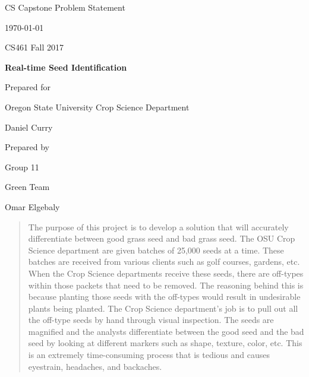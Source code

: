 \documentclass[onecolumn, draftclsnofoot,10pt, compsoc]{IEEEtran}
\def \CapstoneTeamName{			Green Team}
\def \CapstoneTeamNumber{		11}
\def \GroupMemberOne{			Omar Elgebaly}
\def \GroupMemberTwo{			Danny Yang}
\def \GroupMemberThree{			Vinayaka Thompson}
\def \CapstoneProjectName{		Real-time Seed Identification}
\def \CapstoneSponsorCompany{	Oregon State University Crop Science Department}
\def \CapstoneSponsorPerson{	Daniel Curry}
\def \DocType{		Problem Statement
				}
\newcommand{\NameSigPair}[1]{\par
\makebox[2.75in][r]{#1} \hfil 	\makebox[3.25in]{\makebox[2.25in]{\hrulefill} \hfill		\makebox[.75in]{\hrulefill}}
\par\vspace{-12pt} \textit{\tiny\noindent
\makebox[2.75in]{} \hfil		\makebox[3.25in]{\makebox[2.25in][r]{Signature} \hfill	\makebox[.75in][r]{Date}}}}
\renewcommand{\NameSigPair}[1]{#1}
\begin{document}
\begin{titlepage}
    \begin{singlespace}
        \hfill 
        \par\vspace{.2in}
        \centering
        \scshape{
            \huge CS Capstone \DocType \par
            {\large\today}\par
			{\large CS461 Fall 2017}\par
            \vspace{.5in}
            \textbf{\Huge\CapstoneProjectName}\par
            \vfill
            {\large Prepared for}\par
            \Huge \CapstoneSponsorCompany\par
            \vspace{5pt}
            {\Large\NameSigPair{\CapstoneSponsorPerson}\par}
            {\large Prepared by }\par
            Group\CapstoneTeamNumber\par
            \CapstoneTeamName\par 
            \vspace{5pt}
            {\Large
                \NameSigPair{\GroupMemberOne}\par
            }
            \vspace{20pt}
        }
        \begin{abstract}
        	The purpose of this project is to develop a solution that will accurately differentiate between good grass seed and bad grass seed. The OSU Crop Science department are given batches of 25,000 seeds at a time. These batches are received from various clients such as golf courses, gardens, etc. When the Crop Science departments receive these seeds, there are off-types within those packets that need to be removed. The reasoning behind this is because planting those seeds with the off-types would result in undesirable plants being planted.  The Crop Science department’s job is to pull out all the off-type seeds by hand through visual inspection. The seeds are magnified and the analysts differentiate between the good seed and the bad seed by looking at different markers such as  shape, texture, color, etc. This is an extremely time-consuming process that is tedious and causes eyestrain, headaches, and backaches.


\end{abstract}
\end{singlespace}
\end{titlepage}
\end{document}
